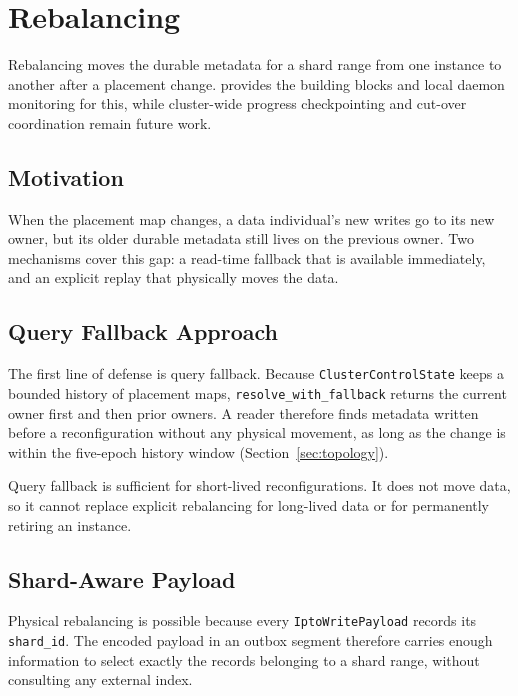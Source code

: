 \section{Rebalancing}
\label{sec:rebalancing}

Rebalancing moves the durable metadata for a shard range from one \ipto{}
instance to another after a placement change. \vannak{} provides the building
blocks and local daemon monitoring for this, while cluster-wide progress
checkpointing and cut-over coordination remain future work.

\subsection{Motivation}

When the placement map changes, a data individual's new writes go to its new
owner, but its older durable metadata still lives on the previous owner. Two
mechanisms cover this gap: a read-time fallback that is available immediately,
and an explicit replay that physically moves the data.

\subsection{Query Fallback Approach}

The first line of defense is query fallback. Because
\texttt{ClusterControlState} keeps a bounded history of placement maps,
\texttt{resolve\_with\_fallback} returns the current owner first and then prior
owners. A reader therefore finds metadata written before a reconfiguration
without any physical movement, as long as the change is within the five-epoch
history window (Section~\ref{sec:topology}).

\begin{vnote}
Query fallback is sufficient for short-lived reconfigurations. It does not move
data, so it cannot replace explicit rebalancing for long-lived data or for
permanently retiring an \ipto{} instance.
\end{vnote}

\subsection{Shard-Aware Payload}

Physical rebalancing is possible because every \texttt{IptoWritePayload} records
its \texttt{shard\_id}. The encoded payload in an outbox segment therefore
carries enough information to select exactly the records belonging to a shard
range, without consulting any external index.

